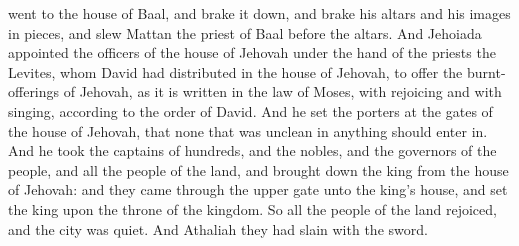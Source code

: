 went to the house of Baal, and brake it down, and brake his altars and his images in pieces, and slew Mattan the priest of Baal before the altars. And Jehoiada appointed the officers of the house of Jehovah under the hand of the priests the Levites, whom David had distributed in the house of Jehovah, to offer the burnt-offerings of Jehovah, as it is written in the law of Moses, with rejoicing and with singing, according to the order of David. And he set the porters at the gates of the house of Jehovah, that none that was unclean in anything should enter in. And he took the captains of hundreds, and the nobles, and the governors of the people, and all the people of the land, and brought down the king from the house of Jehovah: and they came through the upper gate unto the king’s house, and set the king upon the throne of the kingdom. So all the people of the land rejoiced, and the city was quiet. And Athaliah they had slain with the sword. 

